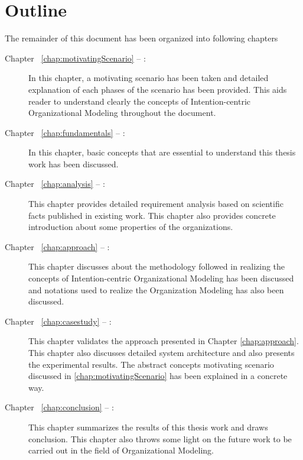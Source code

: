 \section {Outline}
\label{sec:outline}
The remainder of this document has been organized into following chapters
\begin{description}
	\item[Chapter ~\ref{chap:motivatingScenario} -- :] In this chapter, a motivating scenario has been taken and detailed explanation of each phases of the scenario has been provided. This aids reader to understand clearly the concepts of  Intention-centric Organizational Modeling throughout the document. 
	\item[Chapter ~\ref{chap:fundamentals} -- :] In this chapter, basic concepts that are essential to understand this thesis work has been discussed.
	\item[Chapter ~\ref{chap:analysis} -- :] This chapter provides detailed requirement analysis based on scientific facts published in existing work. This chapter also provides concrete introduction about some properties of the organizations.
	\item[Chapter ~\ref{chap:approach} -- :] This chapter discusses about the methodology followed in realizing the concepts  of Intention-centric Organizational Modeling has been discussed and notations used to realize the Organization Modeling has also been discussed.
	\item[Chapter ~\ref{chap:casestudy} -- :] This chapter validates the approach presented in Chapter \ref{chap:approach}. This chapter also discusses detailed system architecture and also presents the experimental results. The abstract concepts motivating scenario discussed in \ref{chap:motivatingScenario} has been explained in a concrete way.
	
	\item[Chapter ~\ref{chap:conclusion} -- :] This chapter summarizes  the results of this thesis work and draws conclusion. This chapter also throws some light on the future work to be carried out in the field of Organizational Modeling. 
\end{description}